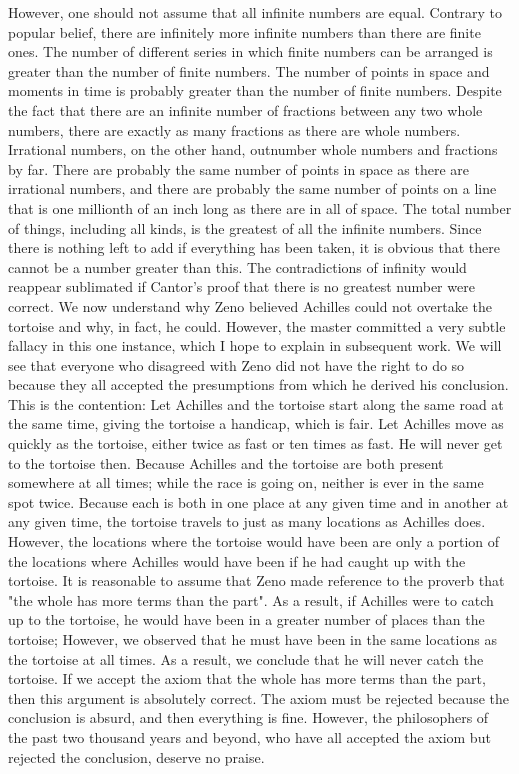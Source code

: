 \documentclass[a4paper,12pt]{book}[2004/02/16]
\theoremstyle{ilemma}
\theoremstyle{itheorem}
\theoremstyle{iother}
\theoremstyle{icorollary}
\theoremstyle{numcorollary}
\theoremstyle{idefinition}
\begin{document}
However, one should not assume that all infinite numbers are equal. Contrary to popular belief, there are infinitely more infinite numbers than there are finite ones. The number of different series in which finite numbers can be arranged is greater than the number of finite numbers. The number of points in space and moments in time is probably greater than the number of finite numbers. Despite the fact that there are an infinite number of fractions between any two whole numbers, there are exactly as many fractions as there are whole numbers. Irrational numbers, on the other hand, outnumber whole numbers and fractions by far. There are probably the same number of points in space as there are irrational numbers, and there are probably the same number of points on a line that is one millionth of an inch long as there are in all of space. The total number of things, including all kinds, is the greatest of all the infinite numbers. Since there is nothing left to add if everything has been taken, it is obvious that there cannot be a number greater than this. The contradictions of infinity would reappear sublimated if Cantor's proof that there is no greatest number were correct.
We now understand why Zeno believed Achilles could not overtake the tortoise and why, in fact, he could. However, the master committed a very subtle fallacy in this one instance, which I hope to explain in subsequent work. We will see that everyone who disagreed with Zeno did not have the right to do so because they all accepted the presumptions from which he derived his conclusion.
This is the contention: Let Achilles and the tortoise start along the same road at the same time, giving the tortoise a handicap, which is fair. Let Achilles move as quickly as the tortoise, either twice as fast or ten times as fast. He will never get to the tortoise then. Because Achilles and the tortoise are both present somewhere at all times;
while the race is going on, neither is ever in the same spot twice. Because each is both in one place at any given time and in another at any given time, the tortoise travels to just as many locations as Achilles does. However, the locations where the tortoise would have been are only a portion of the locations where Achilles would have been if he had caught up with the tortoise. It is reasonable to assume that Zeno made reference to the proverb that "the whole has more terms than the part". As a result, if Achilles were to catch up to the tortoise, he would have been in a greater number of places than the tortoise; However, we observed that he must have been in the same locations as the tortoise at all times. As a result, we conclude that he will never catch the tortoise. If we accept the axiom that the whole has more terms than the part, then this argument is absolutely correct. The axiom must be rejected because the conclusion is absurd, and then everything is fine. However, the philosophers of the past two thousand years and beyond, who have all accepted the axiom but rejected the conclusion, deserve no praise.
\end{document}
